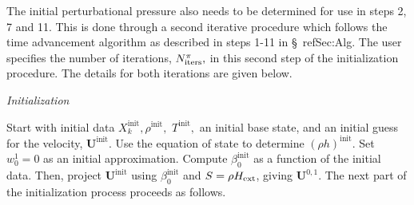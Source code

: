 \documentclass[11pt]{article}
\newcommand{\Hext}{{H_{\rm ext}}}
\newcommand{\initp}{\mathrm{init}}
\newcommand{\ubold}{\mathbf{U}}
\begin{document}
The initial perturbational pressure also needs to be determined for
use in steps 2, 7 and 11. 
This is done through a second iterative procedure which follows the
time advancement algorithm as described in steps 1-11 in \S~ref{Sec:Alg}.  
The user specifies the number of iterations, 
$N_{\rm iters}^{\pi},$ in this second step of the initialization procedure.
The details for both iterations are given below.

 {\em Initialization}

Start with initial data $X_k^{\initp}, \rho^{\initp},$ $T^{\initp},$ an 
initial base state, and an initial guess for the velocity, $\ubold^{\initp}.$
Use the equation of state to determine $(\rho h)^{\initp}$.  Set
$w_0^1 = 0$ as an initial approximation.  Compute $\beta_0^{\initp}$ as a function of 
the initial data.  Then, project $\ubold^{\initp}$ using $\beta_0^{\initp}$ and 
$S = \rho\Hext$, giving $\ubold^{0,1}$.  The next part of the initialization process 
proceeds as follows.
\end{document}
